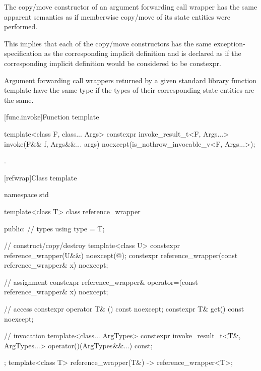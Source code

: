 \pnum
The copy/move constructor of an argument forwarding call wrapper has
the same apparent semantics
as if memberwise copy/move of its state entities
were performed.
\begin{note}
This implies that each of the copy/move constructors has
the same exception-specification as
the corresponding implicit definition and is declared as 
if the corresponding implicit definition would be considered to be constexpr.
\end{note}

\pnum
Argument forwarding call wrappers returned by
a given standard library function template have the same type
if the types of their corresponding state entities are the same.

[func.invoke]{Function template }
%
%
\begin{itemdecl}
template<class F, class... Args>
  constexpr invoke_result_t<F, Args...> invoke(F&& f, Args&&... args)
    noexcept(is_nothrow_invocable_v<F, Args...>);
\end{itemdecl}

\begin{itemdescr}
\pnum
\returns
{}.
\end{itemdescr}

[refwrap]{Class template }

%
%
\begin{codeblock}
namespace std {
  template<class T> class reference_wrapper {
  public:
    // types
    using type = T;

    // construct/copy/destroy
    template<class U>
      constexpr reference_wrapper(U&&) noexcept(@\seebelow@);
    constexpr reference_wrapper(const reference_wrapper& x) noexcept;

    // assignment
    constexpr reference_wrapper& operator=(const reference_wrapper& x) noexcept;

    // access
    constexpr operator T& () const noexcept;
    constexpr T& get() const noexcept;

    // invocation
    template<class... ArgTypes>
      constexpr invoke_result_t<T&, ArgTypes...> operator()(ArgTypes&&...) const;
  };
  template<class T>
    reference_wrapper(T&) -> reference_wrapper<T>;
}
\end{codeblock}

